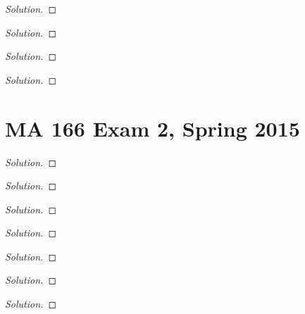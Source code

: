 \begin{proof}[Solution]
\end{proof}
\begin{problem}
\end{problem}
\begin{proof}[Solution]
\end{proof}
\begin{problem}
\end{problem}
\begin{proof}[Solution]
\end{proof}
\begin{problem}
\end{problem}
\begin{proof}[Solution]
\end{proof}

\chapter{MA 166 Exam 2, Spring 2015}
\begin{problem}
\end{problem}
\begin{proof}[Solution]
\end{proof}
\begin{problem}
\end{problem}
\begin{proof}[Solution]
\end{proof}
\begin{problem}
\end{problem}
\begin{proof}[Solution]
\end{proof}
\begin{problem}
\end{problem}
\begin{proof}[Solution]
\end{proof}
\begin{problem}
\end{problem}
\begin{proof}[Solution]
\end{proof}
\begin{problem}
\end{problem}
\begin{proof}[Solution]
\end{proof}
\begin{problem}
\end{problem}
\begin{proof}[Solution]
\end{proof}

